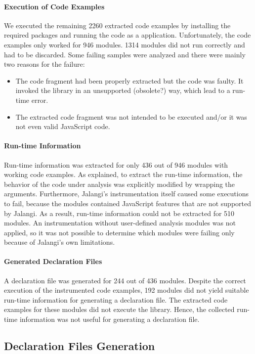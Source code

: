 \documentclass[english,cleveref,autoref,submission]{programming}
\begin{document}
\paragraph*{Execution of Code Examples}
We executed the remaining 2260 extracted code examples by installing the
required packages and running the code as a \NodeJS{}
application. Unfortunately, the code examples only worked for 946
modules. 1314 modules did not run correctly and had to be
discarded. Some failing samples were analyzed and there were mainly
two reasons for the failure: 
\begin{itemize}
\item The code fragment had been properly extracted but the code was
  faulty. It invoked the library in an unsupported
  (obsolete?) way, which lead to a run-time error.
\item The extracted code fragment was not intended to be executed
  and/or it was not even valid JavaScript code. 
\end{itemize}

\paragraph*{Run-time Information}
Run-time information was extracted for only 436 out of 946 modules with working code
examples. As explained, to extract the run-time information, the behavior of the code
under analysis was explicitly modified by wrapping the arguments. Furthermore, Jalangi’s
instrumentation itself caused some executions to fail, because the modules contained
JavaScript features that are not supported by Jalangi. As a result, run-time information
could not be extracted for 510 modules. An instrumentation without user-defined analysis
modules was not applied, so it was not possible to determine which modules were failing
only because of Jalangi’s own limitations. 

\paragraph*{Generated Declaration Files}
A declaration file was generated for 244 out of 436 modules. Despite the correct execution
of the instrumented code examples, 192 modules did not yield suitable run-time information
for generating a declaration file. The extracted code examples for these modules did not
execute the library. Hence, the collected run-time information was not useful
for generating a declaration file. 

\subsection{Declaration Files Generation}
\label{sec:experiments-declaration-files-generation}
\end{document}
